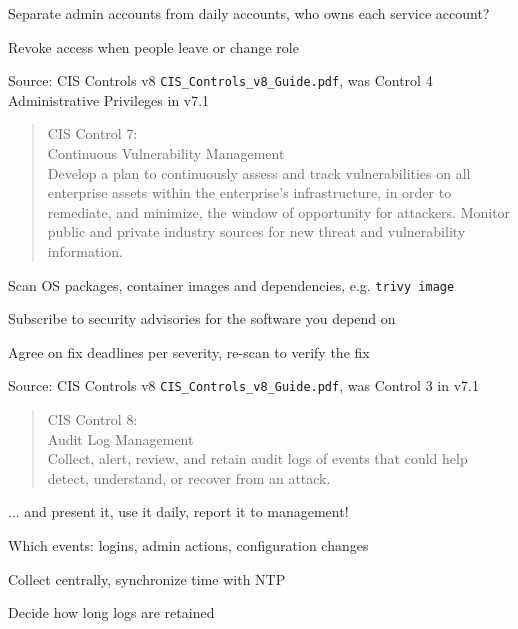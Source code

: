 \documentclass[Screen16to9,17pt]{foils}
\begin{document}
\begin{list1}
\item Separate admin accounts from daily accounts, who owns each service account?
\item Revoke access when people leave or change role
\end{list1}

Source: CIS Controls v8 \verb+CIS_Controls_v8_Guide.pdf+, was Control 4 Administrative Privileges in v7.1



\begin{quote}
CIS Control 7:\\
Continuous Vulnerability Management\\
Develop a plan to continuously assess and track vulnerabilities on all enterprise assets within the enterprise's infrastructure, in order to remediate, and minimize, the window of opportunity for attackers. Monitor public and private industry sources for new threat and vulnerability information.
\end{quote}

\begin{list1}
\item Scan OS packages, container images and dependencies, e.g. \verb+trivy image+
\item Subscribe to security advisories for the software you depend on
\item Agree on fix deadlines per severity, re-scan to verify the fix
\end{list1}

Source: CIS Controls v8 \verb+CIS_Controls_v8_Guide.pdf+, was Control 3 in v7.1



\begin{quote}
CIS Control 8:\\
Audit Log Management\\
Collect, alert, review, and retain audit logs of events that could help detect, understand, or recover from an attack.
\end{quote}

\begin{list1}
\item ... and present it, use it daily, report it to management!
\item Which events: logins, admin actions, configuration changes
\item Collect centrally, synchronize time with NTP
\item Decide how long logs are retained
\end{list1}
\end{document}
